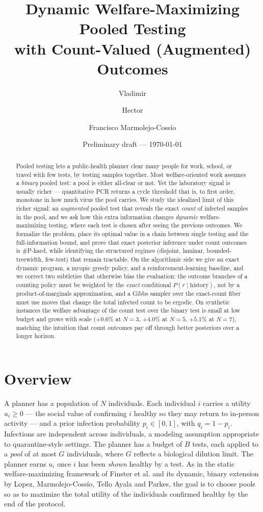 \documentclass[11pt]{article}
\title{\textbf{Dynamic Welfare-Maximizing Pooled Testing\\with Count-Valued (Augmented) Outcomes}}
\author{Vladimir \and Hector \and Francisco Marmolejo-Coss\'io}
\date{Preliminary draft --- \today}
\begin{document}
\maketitle

\begin{abstract}
Pooled testing lets a public-health planner clear many people for work, school,
or travel with few tests, by testing samples together. Most welfare-oriented
work assumes a \emph{binary} pooled test: a pool is either all-clear or not. Yet
the laboratory signal is usually richer --- quantitative PCR returns a cycle
threshold that is, to first order, monotone in how much virus the pool carries.
We study the idealized limit of this richer signal: an \emph{augmented} pooled
test that reveals the exact \emph{count} of infected samples in the pool, and we
ask how this extra information changes \emph{dynamic} welfare-maximizing testing,
where each test is chosen after seeing the previous outcomes. We formalize the
problem, place its optimal value in a chain between single testing and the
full-information bound, and prove that exact posterior inference under count
outcomes is \#P-hard, while identifying the structured regimes (disjoint,
laminar, bounded-treewidth, few-test) that remain tractable. On the algorithmic
side we give an exact dynamic program, a myopic greedy policy, and a
reinforcement-learning baseline, and we correct two subtleties that otherwise
bias the evaluation: the outcome branches of a counting policy must be weighted
by the \emph{exact} conditional $P(r\mid\text{history})$, not by a
product-of-marginals approximation, and a Gibbs sampler over the exact-count
fiber must use moves that change the total infected count to be ergodic. On
synthetic instances the welfare advantage of the count test over the binary test
is small at low budget and grows with scale ($+0.6\%$ at $N{=}3$, $+4.0\%$ at
$N{=}5$, $+5.1\%$ at $N{=}7$), matching the intuition that count outcomes pay
off through better posteriors over a longer horizon.
\end{abstract}

\section{Overview}
A planner has a population of $N$ individuals. Each individual $i$ carries a
utility $u_i \ge 0$ --- the social value of confirming $i$ healthy so they may
return to in-person activity --- and a prior infection probability $p_i \in
[0,1]$, with $q_i = 1-p_i$. Infections are independent across individuals, a
modeling assumption appropriate to quarantine-style settings. The planner has a
budget of $B$ tests, each applied to a \emph{pool} of at most $G$ individuals,
where $G$ reflects a biological dilution limit. The planner earns $u_i$ once $i$
has been \emph{shown} healthy by a test. As in the static welfare-maximizing
framework of Finster et al. and its dynamic, binary extension by Lopez,
Marmolejo-Coss\'io, Tello Ayala and Parkes, the goal is to choose pools so as to
maximize the total utility of the individuals confirmed healthy by the end of the
protocol.
\end{document}
